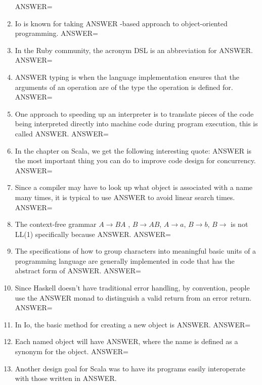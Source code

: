 \documentclass{exam}
\begin{document}
\begin{enumerate}
ANSWER=
\item Io is known for taking ANSWER -based approach to object-oriented programming.\newline
ANSWER=
\item In the Ruby community, the acronym DSL is an abbreviation for ANSWER.\newline
ANSWER=
\item ANSWER typing is when the language implementation ensures that the arguments of an operation are of the type the operation is defined for.\newline
ANSWER=
\item One approach to speeding up an interpreter is to translate pieces of the code being interpreted directly into machine code during program execution, this is called ANSWER.\newline
ANSWER=
\item In the chapter on Scala, we get the following interesting quote: ANSWER is the most important thing you can do to improve code design for concurrency.\newline
ANSWER=
\item Since a compiler may have to look up what object is associated with a name many times, it is typical to use ANSWER to avoid linear search times.\newline
ANSWER=
\item The context-free grammar $A \rightarrow B A$ , $B \rightarrow A B$, $A \rightarrow a$, $B \rightarrow b$, $B \rightarrow$  is not LL(1) specifically because ANSWER.\newline
ANSWER=
\item The specifications of how to group characters into meaningful basic units of a programming language are generally implemented in code that has the abstract form of ANSWER.\newline
ANSWER=
\item Since Haskell doesn't have traditional error handling, by convention, people use the ANSWER monad to distinguish a valid return from an error return.\newline
ANSWER=
\item In Io, the basic method for creating a new object is ANSWER.\newline
ANSWER=
\item Each named object will have ANSWER, where the name is defined as a synonym for the object.\newline
ANSWER=
\item Another design goal for Scala was to have its programs easily interoperate with those written in ANSWER.\newline

\end{enumerate}
\end{document}
